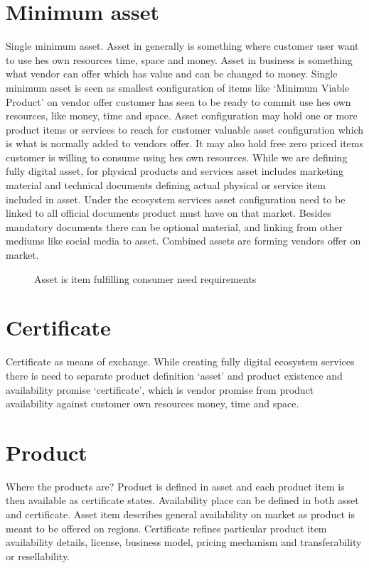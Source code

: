 \section{Minimum asset}\label{minimum_asset}
Single minimum asset. Asset in generally is something where customer user want
to use hes own resources time, space and money. Asset in business is something
what vendor can offer which has value and can be changed to money. Single
minimum asset is seen as smallest configuration of items like `Minimum Viable
Product' on vendor offer customer has seen to be ready to commit use hes own
resources, like money, time and space. Asset configuration may hold one or
more product items or services to reach for customer valuable asset
configuration which is what is normally added to vendors offer. It may also
hold free zero priced items customer is willing to consume using hes own
resources. While we are defining fully digital asset, for physical products
and services asset includes marketing material and technical documents
defining actual physical or service item included in asset. Under the
ecosystem services asset configuration need to be linked to all official
documents product must have on that market. Besides mandatory documents there
can be optional material, and linking from other mediums like social media to
asset. Combined assets are forming vendors offer on market.

\begin{figure} %
 \begin{center}
  \caption{Asset is item fulfilling consumer need requirements}
  \label{fig:asset}
 \end{center}
\end{figure}


\section{Certificate}\label{certificate}
Certificate as means of exchange. While creating fully digital ecosystem
services there is need to separate product definition `asset' and product
existence and availability promise `certificate', which is vendor promise from
product availability against customer own resources money, time and space.

\section{Product}\label{product}
Where the products are? Product is defined in asset and each product item is
then available as certificate states. Availability place can be defined in
both asset and certificate. Asset item describes general availability on
market as product is meant to be offered on regions. Certificate refines
particular product item availability details, license, business model, pricing
mechanism and transferability or resellability.

